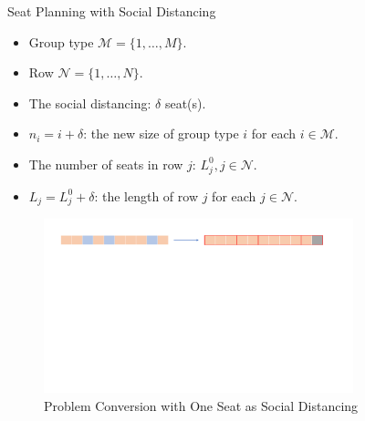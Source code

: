 \begin{frame}{Seat Planning with Social Distancing}
  \begin{itemize}  
    \item Group type $\mathcal{M} = \{1, \ldots, M\}$.
    \item Row $\mathcal{N} = \{1, \ldots, N\}$.
    \item The social distancing: $\delta$ seat(s).
    \item $n_i = i + \delta$: the new size of group type $i$ for each $i \in \mathcal{M}$.
    \item The number of seats in row $j$: $L_j^{0}, j \in \mathcal{N}$.
    \item $L_j = L_j^{0} + \delta$: the length of row $j$ for each $j \in \mathcal{N}$.
    \end{itemize}
    
    \begin{figure}[ht]
      \centering
      \includegraphics[width = 0.8\textwidth]{./images/dummy_seat.pdf}
      \caption{Problem Conversion with One Seat as Social Distancing}
  \end{figure}
  \end{frame}

